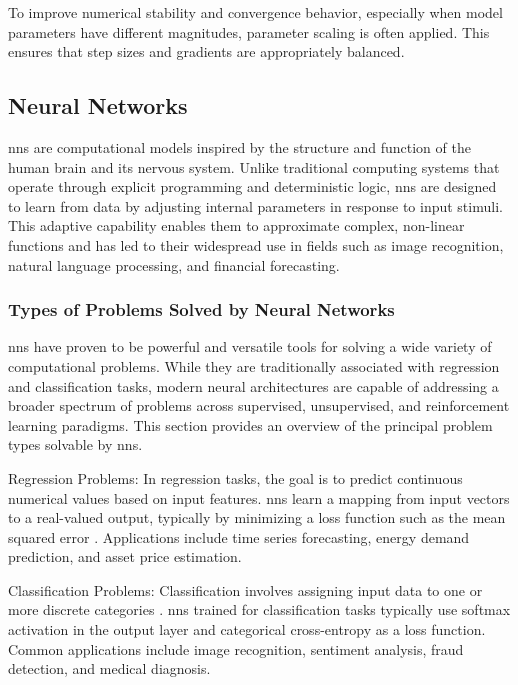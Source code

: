 To improve numerical stability and convergence behavior, especially when model parameters have different magnitudes, parameter scaling is often applied. This ensures that step sizes and gradients are appropriately balanced.

\subsection{Neural Networks}
\ac{nn}s are computational models inspired by the structure and function of the human brain and its nervous system. Unlike traditional computing systems that operate through explicit programming and deterministic logic, \ac{nn}s are designed to learn from data by adjusting internal parameters in response to input stimuli. This adaptive capability enables them to approximate complex, non-linear functions and has led to their widespread use in fields such as image recognition, natural language processing, and financial forecasting.

\subsubsection{Types of Problems Solved by Neural Networks}
\ac{nn}s have proven to be powerful and versatile tools for solving a wide variety of computational problems. While they are traditionally associated with regression and classification tasks, modern neural architectures are capable of addressing a broader spectrum of problems across supervised, unsupervised, and reinforcement learning paradigms. This section provides an overview of the principal problem types solvable by \ac{nn}s.

Regression Problems: In regression tasks, the goal is to predict continuous numerical values based on input features. \ac{nn}s learn a mapping from input vectors to a real-valued output, typically by minimizing a loss function such as the mean squared error \parencite[p.~99]{goodfellow2016deeplearning}. Applications include time series forecasting, energy demand prediction, and asset price estimation.

Classification Problems: Classification involves assigning input data to one or more discrete categories \parencite[p.~98]{goodfellow2016deeplearning}. \ac{nn}s trained for classification tasks typically use softmax activation in the output layer and categorical cross-entropy as a loss function. Common applications include image recognition, sentiment analysis, fraud detection, and medical diagnosis.

